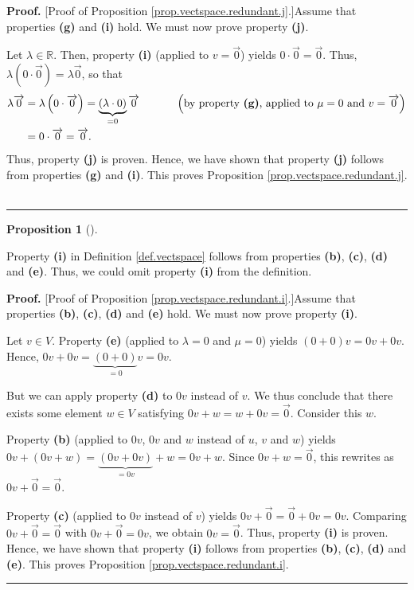 \documentclass[numbers=enddot,12pt,final,onecolumn,notitlepage]{scrartcl}%
\theoremstyle{definition}
\newtheorem{prop}[theo]{Proposition}
\newenvironment{proposition}[1][]
{\begin{prop}[#1]\begin{leftbar}}
{\end{leftbar}\end{prop}}
\newenvironment{proof}[1][Proof]{\noindent\textbf{#1.} }{\ \rule{0.5em}{0.5em}}
\begin{document}
\begin{proof}
[Proof of Proposition \ref{prop.vectspace.redundant.j}.]Assume that properties
\textbf{(g)} and \textbf{(i)} hold. We must now prove property \textbf{(j)}.

Let $\lambda\in\mathbb{R}$. Then, property \textbf{(i)} (applied to
$v=\overrightarrow{0}$) yields $0\cdot\overrightarrow{0}=\overrightarrow{0}$.
Thus, $\lambda\left(  0\cdot\overrightarrow{0}\right)  =\lambda
\overrightarrow{0}$, so that%
\begin{align*}
\lambda\overrightarrow{0}  &  =\lambda\left(  0\cdot\overrightarrow{0}\right)
=\underbrace{\left(  \lambda\cdot0\right)  }_{=0}\overrightarrow{0}%
\ \ \ \ \ \ \ \ \ \ \left(  \text{by property \textbf{(g)}, applied to }%
\mu=0\text{ and }v=\overrightarrow{0}\right) \\
&  =0\cdot\overrightarrow{0}=\overrightarrow{0}.
\end{align*}
Thus, property \textbf{(j)} is proven. Hence, we have shown that property
\textbf{(j)} follows from properties \textbf{(g)} and \textbf{(i)}. This
proves Proposition \ref{prop.vectspace.redundant.j}.
\end{proof}

\begin{proposition}
\label{prop.vectspace.redundant.i}Property \textbf{(i)} in Definition
\ref{def.vectspace} follows from properties \textbf{(b)}, \textbf{(c)},
\textbf{(d)} and \textbf{(e)}. Thus, we could omit property \textbf{(i)} from
the definition.
\end{proposition}

\begin{proof}
[Proof of Proposition \ref{prop.vectspace.redundant.i}.]Assume that properties
\textbf{(b)}, \textbf{(c)}, \textbf{(d)} and \textbf{(e)} hold. We must now
prove property \textbf{(i)}.

Let $v\in V$. Property \textbf{(e)} (applied to $\lambda=0$ and $\mu=0$)
yields $\left(  0+0\right)  v=0v+0v$. Hence, $0v+0v=\underbrace{\left(
0+0\right)  }_{=0}v=0v$.

But we can apply property \textbf{(d)} to $0v$ instead of $v$. We thus
conclude that there exists some element $w\in V$ satisfying
$0v+w=w+0v=\overrightarrow{0}$. Consider this $w$.

Property \textbf{(b)} (applied to $0v$, $0v$ and $w$ instead of $u$, $v$ and
$w$) yields $0v+\left(  0v+w\right)  =\underbrace{\left(  0v+0v\right)
}_{=0v}+w=0v+w$. Since $0v+w=\overrightarrow{0}$, this rewrites as
$0v+\overrightarrow{0}=\overrightarrow{0}$.

Property \textbf{(c)} (applied to $0v$ instead of $v$) yields
$0v+\overrightarrow{0}=\overrightarrow{0}+0v=0v$. Comparing
$0v+\overrightarrow{0}=\overrightarrow{0}$ with $0v+\overrightarrow{0}=0v$, we
obtain $0v=\overrightarrow{0}$. Thus, property \textbf{(i)} is proven. Hence,
we have shown that property \textbf{(i)} follows from properties \textbf{(b)},
\textbf{(c)}, \textbf{(d)} and \textbf{(e)}. This proves Proposition
\ref{prop.vectspace.redundant.i}.
\end{proof}
\end{document}
